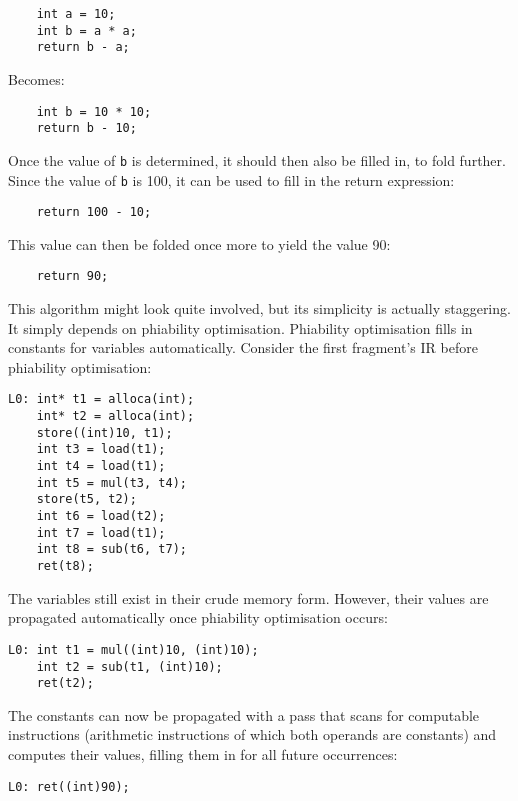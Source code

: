 \documentclass[12pt, a4paper]{article}
\begin{document}
\begin{lstlisting}
	int a = 10;
	int b = a * a;
	return b - a;
\end{lstlisting}

Becomes:

\begin{lstlisting}
	int b = 10 * 10;
	return b - 10;
\end{lstlisting}

Once the value of \verb+b+ is determined, it should then also be filled in, to fold 
further. Since the value of \verb+b+ is 100, it can be used to fill in the return 
expression:

\begin{lstlisting}
	return 100 - 10;
\end{lstlisting}

This value can then be folded once more to yield the value 90:

\begin{lstlisting}
	return 90;
\end{lstlisting}

This algorithm might look quite involved, but its simplicity is actually 
staggering. It simply depends on phiability optimisation. Phiability 
optimisation fills in constants for variables automatically. Consider the first 
fragment's IR before phiability optimisation:

\begin{lstlisting}
L0:	int* t1 = alloca(int);
	int* t2 = alloca(int);
	store((int)10, t1);
	int t3 = load(t1);
	int t4 = load(t1);
	int t5 = mul(t3, t4);
	store(t5, t2);
	int t6 = load(t2);
	int t7 = load(t1);
	int t8 = sub(t6, t7);
	ret(t8);
\end{lstlisting}

The variables still exist in their crude memory form. However, their values are 
propagated automatically once phiability optimisation occurs:

\begin{lstlisting}
L0:	int t1 = mul((int)10, (int)10);
	int t2 = sub(t1, (int)10);
	ret(t2);
\end{lstlisting}

The constants can now be propagated with a pass that scans for computable 
instructions (arithmetic instructions of which both operands are constants) and 
computes their values, filling them in for all future occurrences:

\begin{lstlisting}
L0:	ret((int)90);
\end{lstlisting}
\end{document}
